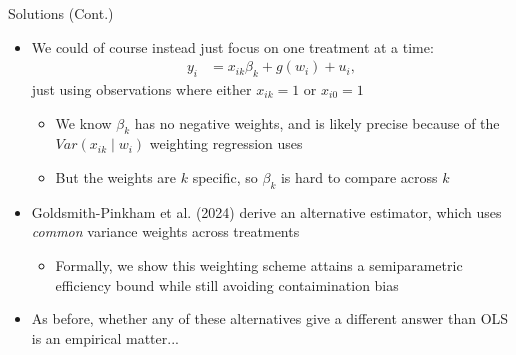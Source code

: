 \documentclass[11pt,english]{beamer}
\begin{document}
\begin{frame}{Solutions (Cont.)}
\vspace{0.2cm}
\begin{itemize}
\item We could of course instead just focus on one treatment at a time:
\begin{align*}
y_i&=x_{ik}\beta_k +g(w_i) +u_i,
\end{align*}
just using observations where either $x_{ik}=1$ or $x_{i0}=1$\smallskip
\begin{itemize}
\item We know $\beta_k$ has no negative weights, and is likely precise because of the $Var(x_{ik}\mid w_i)$ weighting regression uses\smallskip\pause{}
\item But the weights are $k$ specific, so $\beta_k$ is hard to compare across $k$
\end{itemize}\bigskip\pause{}
\item Goldsmith-Pinkham et al. (2024) derive an alternative estimator, which uses \emph{common} variance weights across treatments\smallskip
\begin{itemize}
\item Formally, we show this weighting scheme attains a semiparametric efficiency bound while still avoiding contaimination bias 
\end{itemize}\bigskip\pause{}
\item As before, whether any of these alternatives give a different answer than OLS is an empirical matter...
\end{itemize}

\end{frame}
\end{document}
